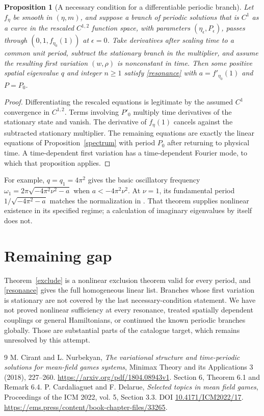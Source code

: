 \documentclass[11pt]{article}
\newtheorem{proposition}[theorem]{Proposition}
\begin{document}
\begin{proposition}[A necessary condition for a differentiable periodic branch]
Let $f_\eta$ be smooth in $(\eta,m)$, and suppose a branch of
periodic solutions that is $C^1$ as a curve in the rescaled $C^{1,2}$
function space, with parameters $(\eta_\epsilon,P_\epsilon)$,
passes through $(0,1,f_{\eta_0}(1))$ at $\epsilon=0$.
Take derivatives after scaling time to a common unit period, subtract the
stationary branch in the multiplier, and assume the resulting first
variation $(w,\rho)$ is nonconstant in time. Then some positive spatial
eigenvalue $q$ and integer $n\geq1$ satisfy \eqref{resonance} with
$a=f'_{\eta_0}(1)$ and $P=P_0$.
\end{proposition}
\begin{proof}
Differentiating the rescaled equations is legitimate by the assumed
$C^1$ convergence in $C^{1,2}$. Terms involving $P'_0$ multiply time
derivatives of the stationary state and vanish. The derivative of
$f_\eta(1)$ cancels against the subtracted stationary multiplier.
The remaining equations are exactly the linear equations of
Proposition~\ref{spectrum} with period $P_0$ after returning to physical
time. A time-dependent first variation has a time-dependent Fourier
mode, to which that proposition applies.
\end{proof}

For example, $q=q_1=4\pi^2$ gives the basic oscillatory frequency
$\omega_1=2\pi\sqrt{-4\pi^2\nu^2-a}$ when $a<-4\pi^2\nu^2$.
At $\nu=1$, its fundamental period
$1/\sqrt{-4\pi^2-a}$ matches the normalization in
\cite[Theorem 6.1]{CN}. That theorem supplies nonlinear existence in
its specified regime; a calculation of imaginary eigenvalues by itself
does not.

\section{Remaining gap}
Theorem~\ref{exclude} is a nonlinear exclusion theorem valid for every
period, and \eqref{resonance} gives the full homogeneous linear list.
Branches whose first variation is stationary are not covered by the last
necessary-condition statement. We have not proved nonlinear sufficiency
at every resonance, treated spatially dependent couplings or general
Hamiltonians, or continued the known periodic branches globally.
Those are substantial parts of the catalogue target, which remains
unresolved by this attempt.

\begin{thebibliography}{9}
 M. Cirant and L. Nurbekyan,
\emph{The variational structure and time-periodic solutions for mean-field games systems},
Minimax Theory and its Applications 3 (2018), 227--260.
\url{https://arxiv.org/pdf/1804.08943v1}. Section 6, Theorem 6.1 and Remark 6.4.
 P. Cardaliaguet and F. Delarue,
\emph{Selected topics in mean field games}, Proceedings of the ICM 2022,
vol. 5, Section 3.3. DOI \href{https://doi.org/10.4171/ICM2022/17}{10.4171/ICM2022/17}.
\url{https://ems.press/content/book-chapter-files/33265}.
\end{thebibliography}
\end{document}
